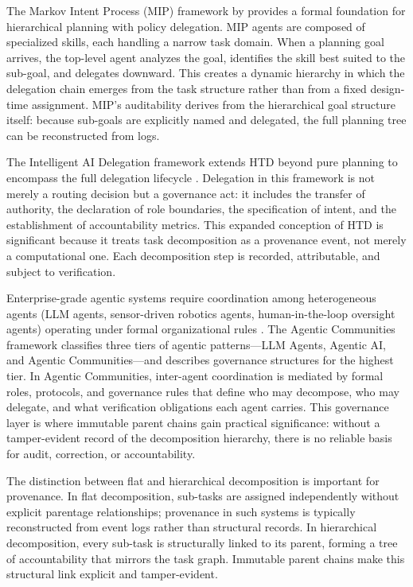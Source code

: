 The Markov Intent Process (MIP) framework by \cite{roijers2020robust} provides a formal foundation for hierarchical planning with policy delegation. MIP agents are composed of specialized skills, each handling a narrow task domain. When a planning goal arrives, the top-level agent analyzes the goal, identifies the skill best suited to the sub-goal, and delegates downward. This creates a dynamic hierarchy in which the delegation chain emerges from the task structure rather than from a fixed design-time assignment. MIP's auditability derives from the hierarchical goal structure itself: because sub-goals are explicitly named and delegated, the full planning tree can be reconstructed from logs.

The Intelligent AI Delegation framework extends HTD beyond pure planning to encompass the full delegation lifecycle \cite{tomasev2026intelligent}. Delegation in this framework is not merely a routing decision but a governance act: it includes the transfer of authority, the declaration of role boundaries, the specification of intent, and the establishment of accountability metrics. This expanded conception of HTD is significant because it treats task decomposition as a provenance event, not merely a computational one. Each decomposition step is recorded, attributable, and subject to verification.

Enterprise-grade agentic systems require coordination among heterogeneous agents (LLM agents, sensor-driven robotics agents, human-in-the-loop oversight agents) operating under formal organizational rules \cite{agenticcommunities2026}. The Agentic Communities framework classifies three tiers of agentic patterns---LLM Agents, Agentic AI, and Agentic Communities---and describes governance structures for the highest tier. In Agentic Communities, inter-agent coordination is mediated by formal roles, protocols, and governance rules that define who may decompose, who may delegate, and what verification obligations each agent carries. This governance layer is where immutable parent chains gain practical significance: without a tamper-evident record of the decomposition hierarchy, there is no reliable basis for audit, correction, or accountability.

The distinction between flat and hierarchical decomposition is important for provenance. In flat decomposition, sub-tasks are assigned independently without explicit parentage relationships; provenance in such systems is typically reconstructed from event logs rather than structural records. In hierarchical decomposition, every sub-task is structurally linked to its parent, forming a tree of accountability that mirrors the task graph. Immutable parent chains make this structural link explicit and tamper-evident.

